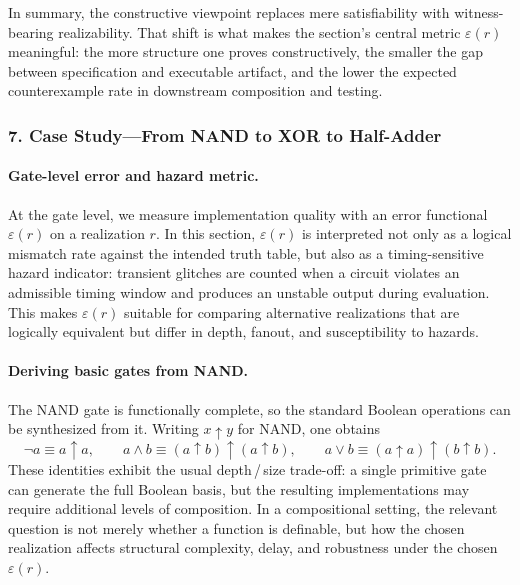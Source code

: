 \documentclass[11pt]{article}
\begin{document}
In summary, the constructive viewpoint replaces mere satisfiability with witness-bearing realizability. That shift is what makes the section's central metric \(\varepsilon(r)\) meaningful: the more structure one proves constructively, the smaller the gap between specification and executable artifact, and the lower the expected counterexample rate in downstream composition and testing.



\subsubsection{7. Case Study—From NAND to XOR to Half-Adder}


\paragraph{Gate-level error and hazard metric.}
At the gate level, we measure implementation quality with an error functional \(\varepsilon(r)\) on a realization \(r\). In this section, \(\varepsilon(r)\) is interpreted not only as a logical mismatch rate against the intended truth table, but also as a timing-sensitive hazard indicator: transient glitches are counted when a circuit violates an admissible timing window and produces an unstable output during evaluation. This makes \(\varepsilon(r)\) suitable for comparing alternative realizations that are logically equivalent but differ in depth, fanout, and susceptibility to hazards.

\paragraph{Deriving basic gates from NAND.}
The NAND gate is functionally complete, so the standard Boolean operations can be synthesized from it. Writing \(x \uparrow y\) for NAND, one obtains
\[
\neg a \equiv a \uparrow a,
\qquad
 a \wedge b \equiv (a \uparrow b) \uparrow (a \uparrow b),
\qquad
 a \vee b \equiv (a \uparrow a) \uparrow (b \uparrow b).
\]
These identities exhibit the usual depth\,/\,size trade-off: a single primitive gate can generate the full Boolean basis, but the resulting implementations may require additional levels of composition. In a compositional setting, the relevant question is not merely whether a function is definable, but how the chosen realization affects structural complexity, delay, and robustness under the chosen \(\varepsilon(r)\).
\end{document}
